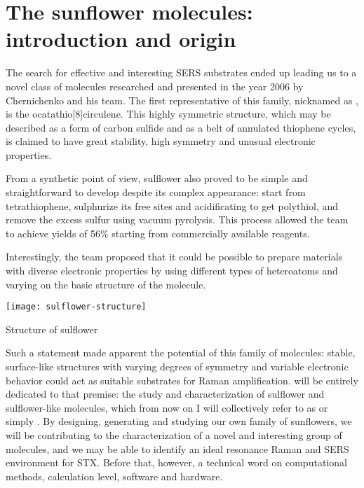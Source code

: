 \section{The sunflower molecules: introduction and origin}

The search for effective and interesting SERS substrates ended up leading us to a novel class of molecules researched and presented in the year 2006 by Chernichenko and his team.
The first representative of this family, nicknamed as , is the ocatathio[8]circulene.
This highly symmetric structure, which may be described as a form of carbon sulfide and as a belt of annulated thiophene cycles, is claimed to have great stability, high symmetry and unusual electronic properties.

From a synthetic point of view, sulflower also proved to be simple and straightforward to develop despite its complex appearance: start from tetrathiophene, sulphurize its free sites and acidificating to get polythiol, and remove the excess sulfur using vacuum pyrolysis.
This process allowed the team to achieve yields of 56\% starting from commercially available reagents.

Interestingly, the team proposed that it could be possible to prepare materials with diverse electronic properties by using different types of heteroatoms and varying on the basic structure of the molecule.%
\begin{marginfigure}
    \texttt{[image: sulflower-structure]}
    \caption[Structure of sulflower]{Structure of sulflower}
\end{marginfigure}%
Such a statement made apparent the potential of this family of molecules: stable, surface-like structures with varying degrees of symmetry and variable electronic behavior could act as suitable substrates for Raman amplification.
 will be entirely dedicated to that premise: the study and characterization of sulflower and sulflower-like molecules, which from now on I will collectively refer to as  or simply .
By designing, generating and studying our own family of sunflowers, we will be contributing to the characterization of a novel and interesting group of molecules, and we may be able to identify an ideal resonance Raman and SERS environment for STX.
Before that, however, a technical word on computational methods, calculation level, software and hardware.
